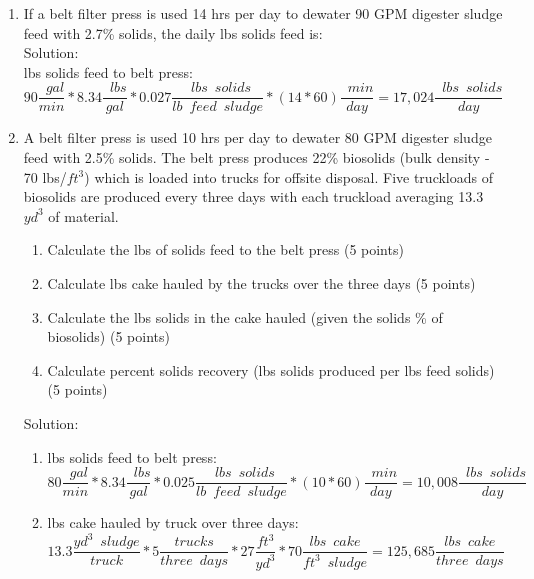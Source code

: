 \documentclass{article}
\begin{document}
\begin{enumerate}
\item If a belt filter press is used 14 hrs per day to dewater 90 GPM digester sludge feed with 2.7\% solids, the daily lbs solids feed is:\\
Solution:\\
lbs solids feed to belt press:\\
$90\dfrac{\enspace gal}{min}*8.34\dfrac{\enspace lbs}{gal}*
0.027\dfrac{\enspace lbs \enspace solids}{lb \enspace feed \enspace sludge}*(14*60)\dfrac{\enspace min}{day}=\boxed{17,024\dfrac{\enspace lbs \enspace solids}{day}}$\\


\item A belt filter press is used 10 hrs per day to dewater 80 GPM digester sludge feed with 2.5\% solids.  The belt press produces 22\% biosolids (bulk density - 70 lbs/$ft^3$) which is loaded into trucks for offsite disposal.  Five truckloads of biosolids are produced every three days with each truckload averaging 13.3 $yd^3$ of material.
\begin{enumerate}
\item Calculate the lbs of solids feed to the belt press (5 points)
\item Calculate lbs cake hauled by the trucks over the three days (5 points) 
\item Calculate the lbs solids in the cake hauled (given the solids \% of biosolids) (5 points) 
\item Calculate percent solids recovery (lbs solids produced per lbs feed solids) (5 points) 
\end{enumerate}

Solution:\\
\begin{enumerate}
\item lbs solids feed to belt press:\\
$80\dfrac{\enspace gal}{min}*8.34\dfrac{\enspace lbs}{gal}*
0.025\dfrac{\enspace lbs \enspace solids}{lb \enspace feed \enspace sludge}*(10*60)\dfrac{\enspace min}{day}=\boxed{10,008\dfrac{\enspace lbs \enspace solids}{day}}$\\
\item lbs cake hauled by truck over three days:\\
$
	13.3 
	\dfrac{yd^3 \enspace sludge}{truck}
	*
	5
	\dfrac{trucks}{three \enspace days}
	*
	27 
	\dfrac
	{
	ft^3
	}
	{
	yd^3
	}
	*
	70
	\dfrac
	{
	lbs \enspace cake
	}
	{ft^3 \enspace sludge
	}
	=\boxed
	{125,685 
	\dfrac{lbs \enspace cake}{three \enspace days}}
$


\end{enumerate}
\end{enumerate}
\end{document}
